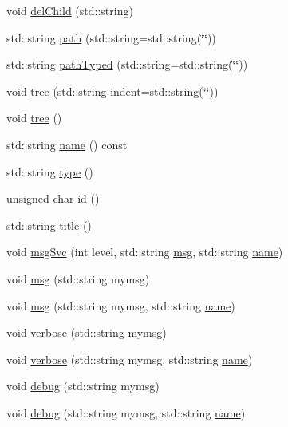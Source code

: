 \begin{DoxyCompactItemize}
\item 
void \hyperlink{classHierarchy_a1928ac7615fe0b5e55cd707f70dc6781}{del\+Child} (std\+::string)
\item 
std\+::string \hyperlink{classHierarchy_aa7990fa7caf132d83e361ce033c6c65a}{path} (std\+::string=std\+::string(\char`\"{}\char`\"{}))
\item 
std\+::string \hyperlink{classHierarchy_a1efd56cd164d328d2002e53a10a19b8c}{path\+Typed} (std\+::string=std\+::string(\char`\"{}\char`\"{}))
\item 
void \hyperlink{classHierarchy_a76e914b9a677a22a82deb74d892bf261}{tree} (std\+::string indent=std\+::string(\char`\"{}\char`\"{}))
\item 
void \hyperlink{classHierarchy_a594c294c5f60c230e106d522ed008212}{tree} ()
\item 
std\+::string \hyperlink{classObject_a300f4c05dd468c7bb8b3c968868443c1}{name} () const
\item 
std\+::string \hyperlink{classObject_a84f99f70f144a83e1582d1d0f84e4e62}{type} ()
\item 
unsigned char \hyperlink{classObject_af99145335cc61ff6e2798ea17db009d2}{id} ()
\item 
std\+::string \hyperlink{classObject_a73a0f1a41828fdd8303dd662446fb6c3}{title} ()
\item 
void \hyperlink{classObject_a3f9d5537ebce0c0f2bf6ae4d92426f3c}{msg\+Svc} (int level, std\+::string \hyperlink{classObject_a58b2d0618c2d08cf2383012611528d97}{msg}, std\+::string \hyperlink{classObject_a300f4c05dd468c7bb8b3c968868443c1}{name})
\item 
void \hyperlink{classObject_a58b2d0618c2d08cf2383012611528d97}{msg} (std\+::string mymsg)
\item 
void \hyperlink{classObject_ac5d59299273cee27aacf7de00d2e7034}{msg} (std\+::string mymsg, std\+::string \hyperlink{classObject_a300f4c05dd468c7bb8b3c968868443c1}{name})
\item 
void \hyperlink{classObject_a83d2db2df682907ea1115ad721c1c4a1}{verbose} (std\+::string mymsg)
\item 
void \hyperlink{classObject_a2d4120195317e2a3c6532e8bb9f3da68}{verbose} (std\+::string mymsg, std\+::string \hyperlink{classObject_a300f4c05dd468c7bb8b3c968868443c1}{name})
\item 
void \hyperlink{classObject_aac010553f022165573714b7014a15f0d}{debug} (std\+::string mymsg)
\item 
void \hyperlink{classObject_a6c9a0397ca804e04d675ed05683f5420}{debug} (std\+::string mymsg, std\+::string \hyperlink{classObject_a300f4c05dd468c7bb8b3c968868443c1}{name})

\end{DoxyCompactItemize}
